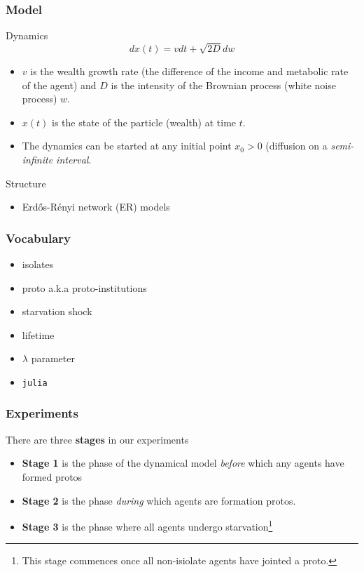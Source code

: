 \documentclass{beamer}
\begin{document}
\begin{frame}[t]
\frametitle{Model}

Dynamics
\begin{equation}\label{ddm}
dx(t) = vdt + \sqrt{2D} dw
\end{equation}

\begin{itemize}
\item $v$ is the wealth growth rate (the difference of the income and metabolic rate of the agent) and $D$ is the intensity of the Brownian process (white noise process) $w$. 
\item $x(t)$ is the state of the particle (wealth) at time $t$. 
\item The dynamics can be started at any initial point $x_0 > 0$ (diffusion on a \textit{semi-infinite interval}. 
\end{itemize}
Structure
\begin{itemize}
\item Erd\H{o}s-R\'{e}nyi network (ER) models
\end{itemize}
\end{frame}

\begin{frame}[t]
\frametitle{Vocabulary}
\begin{itemize}
\item isolates
\item proto a.k.a proto-institutions
\item starvation shock 
\item lifetime 
\item $\lambda$ parameter 
\item \texttt{julia}
\end{itemize}
\end{frame}

\begin{frame}[t]
\frametitle{Experiments}
There are three \textbf{stages} in our experiments
\begin{itemize}
\item \textbf{Stage 1} is the phase of the dynamical model \textit{before} which any agents have formed protos
\item \textbf{Stage 2} is the phase \textit{during} which agents are formation protos.
\item \textbf{Stage 3} is the phase where all agents undergo starvation\footnote{This stage commences once all non-isiolate agents have jointed a proto.} 
\end{itemize}
\end{frame}
\end{document}

